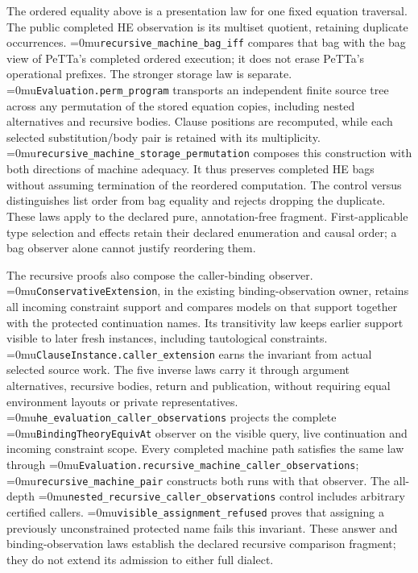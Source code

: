 \documentclass[11pt,a4paper]{article}
\newcommand{\code}[1]{\texttt{\detokenize{#1}}}
\newcommand{\name}[1]{\textup{\Urlmuskip=0mu\relax\nolinkurl{#1}}}
\begin{document}
The ordered equality above is a presentation law for one fixed equation
traversal. The public completed HE observation is its multiset quotient,
retaining duplicate occurrences. \name{recursive\_machine\_bag\_iff}
compares that bag with the bag view of PeTTa's completed ordered execution;
it does not erase PeTTa's operational prefixes. The stronger storage law is
separate. \name{Evaluation.perm\_program} transports an independent finite
source tree across any permutation of the stored equation copies, including
nested alternatives and recursive bodies. Clause positions are recomputed,
while each selected substitution/body pair is retained with its multiplicity.
\name{recursive\_machine\_storage\_permutation} composes this construction
with both directions of machine adequacy. It thus preserves completed HE
bags without assuming termination of the reordered computation. The control
\code{[A,B,A]} versus \code{[B,A,A]} distinguishes list order from bag equality
and rejects dropping the duplicate. These laws apply to the declared pure,
annotation-free fragment. First-applicable type selection and effects retain
their declared enumeration and causal order; a bag observer alone cannot
justify reordering them.

The recursive proofs also compose the caller-binding observer.
\name{ConservativeExtension}, in the existing binding-observation owner,
retains all incoming constraint support and compares models on that support
together with the protected continuation names. Its transitivity law keeps
earlier support visible to later fresh instances, including tautological
constraints. \name{ClauseInstance.caller\_extension} earns the invariant
from actual selected source work. The five inverse laws carry it through
argument alternatives, recursive bodies, return and publication, without
requiring equal environment layouts or private representatives.
\name{he\_evaluation\_caller\_observations} projects the complete
\name{BindingTheoryEquivAt} observer on the visible query, live continuation
and incoming constraint scope. Every completed machine path satisfies the
same law through \name{Evaluation.recursive\_machine\_caller\_observations};
\name{recursive\_machine\_pair} constructs both runs with that observer.
The all-depth \name{nested\_recursive\_caller\_observations} control includes
arbitrary certified callers. \name{visible\_assignment\_refused} proves that
assigning a previously unconstrained protected name fails this invariant.
These answer and binding-observation laws establish the declared recursive
comparison fragment; they do not extend its admission to either full dialect.
\end{document}
